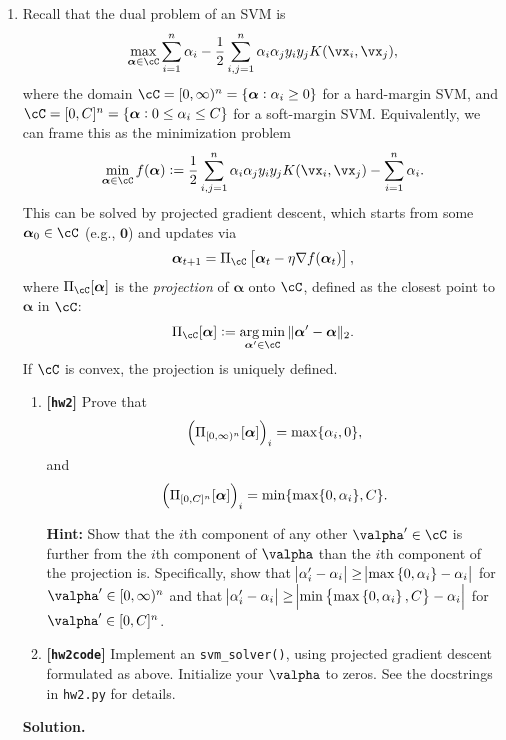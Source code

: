 \documentclass{article}
\def\balpha{\boldsymbol{\alpha}}
\DeclareMathOperator*{\argmin}{arg\,min}
\def\hw{\textbf{[\texttt{hw2}]}\xspace}
\def\hwcode{\textbf{[\texttt{hw2code}]}\xspace}
\theoremstyle{definition}
\theoremstyle{remark}
\newenvironment{Q}
{%
\clearpage
\item
}
{%
\phantom{s}%
\bigskip%
\noindent\textbf{Solution.}
}
\begin{document}
\begin{enumerate}[font={\Large\bfseries},leftmargin=0pt]
\begin{Q}
    Recall that the dual problem of an SVM is
    \begin{align*}
        \max_{\balpha\in\cC}\sum_{i=1}^{n}\alpha_i-\frac{1}{2}\sum_{i,j=1}^{n}\alpha_i\alpha_jy_iy_jK(\vx_i,\vx_j),
    \end{align*}
    where the domain $\cC=[0,\infty)^n=\{\balpha:\alpha_i\ge0\}$ for a  hard-margin SVM, and $\cC=[0,C]^n=\{\balpha:0\le\alpha_i\le C\}$ for a soft-margin SVM. Equivalently, we can frame this as the minimization problem
    \begin{align*}
        \min_{\balpha\in\cC}f(\balpha):=\frac{1}{2}\sum_{i,j=1}^{n}\alpha_i\alpha_jy_iy_jK(\vx_i,\vx_j)-\sum_{i=1}^{n}\alpha_i.
    \end{align*}
    This can be solved by projected gradient descent, which starts from some $\balpha_0\in\cC$ (e.g., $\boldsymbol{0}$) and updates via
    \begin{align*}
        \balpha_{t+1}=\Pi_{\cC}\sbr{\balpha_t-\eta\nabla f(\balpha_t)},
    \end{align*}
    where $\Pi_{\cC}[\balpha]$ is the \emph{projection} of $\balpha$ onto $\cC$, defined as the closest point to $\balpha$ in $\cC$:
    \begin{align*}
        \Pi_{\cC}[\balpha]:=\argmin_{\balpha'\in\cC}\|\balpha'-\balpha\|_2.
    \end{align*}
    If $\cC$ is convex, the projection is uniquely defined.

    \begin{enumerate}
        \item \hw Prove that
        \begin{align*}
            \del{\Pi_{[0,\infty)^n}[\balpha]}_i=\max\{\alpha_i,0\},
        \end{align*}
        and
        \begin{align*}
            \del{\Pi_{[0,C]^n}[\balpha]}_i=\min\{\max\{0,\alpha_i\},C\}.
        \end{align*}
        
        \textbf{Hint:} Show that the $i$th component of any other $\valpha' \in \cC$ is further from the $i$th component of $\valpha$ than the $i$th component of the projection is. Specifically, show that $\abs{\alpha'_i - \alpha_i} \ge \abs{\max\cbr{0, \alpha_i} - \alpha_i}$ for $\valpha' \in [0,\infty)^n$ and that $\abs{\alpha'_i - \alpha_i} \ge \abs{\min\cbr{\max\cbr{0, \alpha_i}, C} - \alpha_i}$ for $\valpha' \in [0,C]^n$.

        \item 
          \hwcode Implement an \texttt{svm\_solver()}, using projected gradient descent formulated as above. Initialize your $\valpha$ to zeros. See the docstrings in \texttt{hw2.py} for details.
        

\end{enumerate}
\end{Q}
\end{enumerate}
\end{document}
